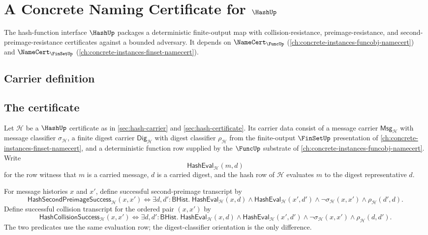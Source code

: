 \chapter{A Concrete Naming Certificate for $\HashUp$}
\label{ch:concrete-instances-hash-namecert}

The hash-function interface $\HashUp$ packages a deterministic finite-output map with collision-resistance, preimage-resistance, and second-preimage-resistance certificates against a bounded adversary. It depends on $\NameCert_{\FuncUp}$ (\autoref{ch:concrete-instances-funcobj-namecert}) and $\NameCert_{\FinSetUp}$ (\autoref{ch:concrete-instances-finset-namecert}).

\section{Carrier definition}
\label{sec:hash-carrier}

\section{The certificate}
\label{sec:hash-certificate}

\begin{definition}
\label{def:hash-evaluation-success-transcripts}
Let $\mathcal H$ be a $\HashUp$ certificate as in \autoref{sec:hash-carrier} and \autoref{sec:hash-certificate}. Its carrier data consist of a message carrier $\mathsf{Msg}_{\mathcal H}$ with message classifier $\sigma_{\mathcal H}$, a finite digest carrier $\mathsf{Dig}_{\mathcal H}$ with digest classifier $\rho_{\mathcal H}$ from the finite-output $\FinSetUp$ presentation of \autoref{ch:concrete-instances-finset-namecert}, and a deterministic function row supplied by the $\FuncUp$ substrate of \autoref{ch:concrete-instances-funcobj-namecert}. Write
$$
\mathsf{HashEval}_{\mathcal H}(m,d)
$$
for the row witness that $m$ is a carried message, $d$ is a carried digest, and the hash row of $\mathcal H$ evaluates $m$ to the digest representative $d$.

For message histories $x$ and $x'$, define successful second-preimage transcript by
$$
\mathsf{HashSecondPreimageSuccess}_{\mathcal H}(x,x')
\Longleftrightarrow
\exists d,d':\mathsf{BHist}.\;
\mathsf{HashEval}_{\mathcal H}(x,d)\land
\mathsf{HashEval}_{\mathcal H}(x',d')\land
\neg\sigma_{\mathcal H}(x,x')\land
\rho_{\mathcal H}(d',d).
$$
Define successful collision transcript for the ordered pair $(x,x')$ by
$$
\mathsf{HashCollisionSuccess}_{\mathcal H}(x,x')
\Longleftrightarrow
\exists d,d':\mathsf{BHist}.\;
\mathsf{HashEval}_{\mathcal H}(x,d)\land
\mathsf{HashEval}_{\mathcal H}(x',d')\land
\neg\sigma_{\mathcal H}(x,x')\land
\rho_{\mathcal H}(d,d').
$$
The two predicates use the same evaluation row; the digest-classifier orientation is the only difference.
\end{definition}

